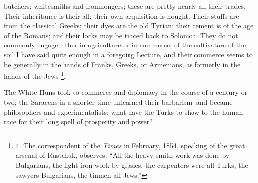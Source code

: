 butchers; whitesmiths and ironmongers; these are pretty nearly all
their trades. Their inheritance is their all; their own acquisition is
nought. Their stuffs are from the classical Greeks; their dyes are the
old Tyrian; their cement is of the age of the Romans; and their locks
may be traced back to Solomon. They do not commonly engage either in
agriculture or in commerce; of the cultivators of the soil I have said
quite enough in a foregoing Lecture, and their commerce seems to be
generally in the hands of Franks, Greeks, or Armenians, as
formerly in the hands of the Jews \footnote{4.
The correspondent of the \emph{Times} in February, 1854, speaking of
the great arsenal of Rustchuk, observes: ``All the heavy smith work was
done by Bulgarians, the light iron work by gipsies, the carpenters
were all Turks, the sawyers Bulgarians, the tinmen all Jews.''}.

The White Huns took to
commerce and diplomacy in the course of a century or two; the Saracens
in a shorter time unlearned their barbarism, and became philosophers
and experimentalists; what have the Turks to show to the human race
for their long spell of prosperity and power?

